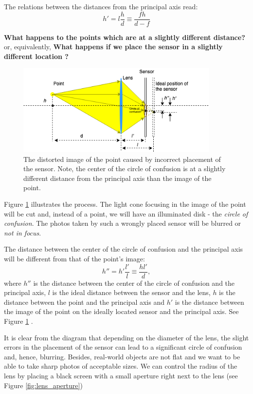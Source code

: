 \documentclass[a4paper,10pt]{article}
\begin{document}
The relations between the distances from the principal axis read:
\begin{equation}
h' = l\frac{h}{d}\equiv \frac{fh}{d-f}
\end{equation} 


{\bf What happens to the points which are at a slightly different distance?} or, equivalently,  {\bf What happens if we place the sensor in a slightly different location ?}

\begin{figure}[h]
\centering
 \includegraphics[width=0.9\textwidth]{../../images/lens_confusion_circle.png}
 \caption{The distorted image of the point caused by incorrect placement of the sensor. Note, the center of the circle of confusion is at a slightly different distance from the principal axis than the image of the point.}
 \label{fig:lens_cconf}
\end{figure}

Figure \ref{fig:lens_cconf} illustrates the process. The light cone focusing in the image of the point will be cut and, instead of a point, we will have an illuminated disk - the {\it circle of confusion}. The photos taken by such a wrongly placed sensor will be blurred or {\it not in focus}. 

The distance between the center of the circle of confusion and the principal axis will be different from that of the point's image:
\begin{equation}
h'' = h'\frac{l'}{l} \equiv \frac{hl'}{d},
\label{dcirc}
\end{equation} 
where $h''$ is the distance between the center of the circle of confusion and the principal axis, $l$ is the ideal distance between the sensor and the lens, $h$ is the distance between the point and the principal axis and $h'$ is the distance between the image of the point on the ideally located sensor and the principal axis. See Figure \ref{fig:lens_cconf} .


It is clear from the diagram that depending on the diameter of the lens, the slight errors in the placement of the sensor can lead to a significant circle of confusion and, hence, blurring. Besides, real-world objects are not flat and we want to be able to take sharp photos of acceptable sizes. We can control  the radius of the lens by placing a black screen with a small aperture right next to the lens (see Figure \ref{fig:lens_aperture}) 
\end{document}
